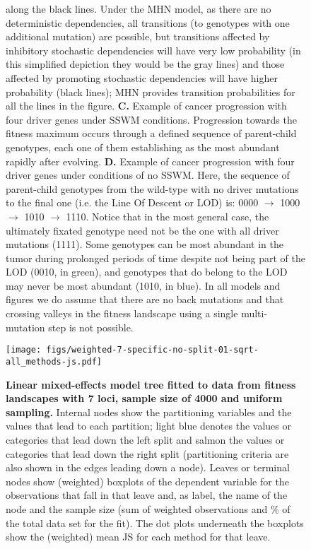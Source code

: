 \documentclass[a4paper,10pt]{article}
\begin{document}
\begin{figure}[H]
{          along the black lines.  Under the MHN model, as there are no
          deterministic dependencies, all transitions (to genotypes with
          one additional mutation) are possible, but transitions affected
          by inhibitory stochastic dependencies will have very low
          probability (in this simplified depiction they would be the gray
          lines) and those affected by promoting stochastic dependencies
          will have higher probability (black lines); MHN provides
          transition probabilities for all the lines in the figure.
          \textbf{C.}  Example of cancer progression with four driver
          genes under SSWM conditions. Progression towards the fitness
          maximum occurs through a defined sequence of parent-child
          genotypes, each one of them establishing as the most abundant
          rapidly after evolving. \textbf{D.} Example of cancer
          progression with four driver genes under conditions of no
          SSWM. Here, the sequence of parent-child genotypes from the
          wild-type with no driver mutations to the final one (i.e. the
          Line Of Descent or LOD) is: 0000 $\rightarrow$ 1000
          $\rightarrow$ 1010 $\rightarrow$ 1110. Notice that in the most
          general case, the ultimately fixated genotype need not be the
          one with all driver mutations (1111).  Some genotypes can be
          most abundant in the tumor during prolonged periods of time
          despite not being part of the LOD (0010, in green), and
          genotypes that do belong to the LOD may never be most abundant
          (1010, in blue). In all models and figures we do assume that
          there are no back mutations and that crossing valleys in the
          fitness landscape using a single multi-mutation step is not
          possible. }\label{fig:fig1}
\end{figure}



 
\begin{landscape}
  \begin{figure}[!h]
    \vspace*{-45pt}
\texttt{[image: figs/weighted-7-specific-no-split-01-sqrt-all\_methods-js.pdf]}
  \internallinenumbers
  \caption{\textbf{Linear mixed-effects model tree fitted to data from
      fitness landscapes with 7 loci, sample size of 4000 and uniform
      sampling.}  Internal nodes show the partitioning variables and the
    values that lead to each partition; light blue denotes the values or
    categories that lead down the left split and salmon the values or
    categories that lead down the right split (partitioning criteria are
    also shown in the edges leading down a node). Leaves or terminal nodes
    show (weighted) boxplots of the dependent variable for the
    observations that fall in that leave and, as label, the
    name of the node and the sample size (sum of weighted observations and
    \% of the total data set for the fit). The dot plots underneath the
    boxplots show the (weighted) mean JS for each method for that leave.}
  \label{fig:7_spec} \end{figure}
\end{landscape}
\end{document}

